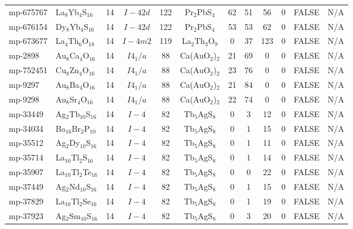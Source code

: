 {\begin{longtable}{llcccccccccc}
    mp-675767 & La$_{8}$Yb$_{4}$S$_{16}$ & 14    & $I-42d$ & 122   & Pr$_{2}$PbS$_{4}$ & 62    & 51    & 56    & 0     & FALSE & N/A \\
    mp-676154 & Dy$_{8}$Yb$_{4}$S$_{16}$ & 14    & $I-42d$ & 122   & Pr$_{2}$PbS$_{4}$ & 53    & 53    & 62    & 0     & FALSE & N/A \\
    mp-673677 & La$_{4}$Th$_{6}$O$_{18}$ & 14    & $I-4m2$ & 119   & La$_{2}$Th$_{3}$O$_{9}$ & 0     & 37    & 123   & 0     & FALSE & N/A \\
    mp-2898 & Au$_{8}$Ca$_{4}$O$_{16}$ & 14    & $I4_1/a$ & 88    & Ca(AuO$_{2}$)$_{2}$ & 21    & 69    & 0     & 0     & FALSE & N/A \\
    mp-752451 & Cu$_{8}$Zn$_{4}$O$_{16}$ & 14    & $I4_1/a$ & 88    & Ca(AuO$_{2}$)$_{2}$ & 23    & 76    & 0     & 0     & FALSE & N/A \\
    mp-9297 & Au$_{8}$Ba$_{4}$O$_{16}$ & 14    & $I4_1/a$ & 88    & Ca(AuO$_{2}$)$_{2}$ & 21    & 84    & 0     & 0     & FALSE & N/A \\
    mp-9298 & Au$_{8}$Sr$_{4}$O$_{16}$ & 14    & $I4_1/a$ & 88    & Ca(AuO$_{2}$)$_{2}$ & 22    & 74    & 0     & 0     & FALSE & N/A \\
    mp-33449 & Ag$_{2}$Tb$_{10}$S$_{16}$ & 14    & $I-4$ & 82    & Tb$_{5}$AgS$_{8}$ & 0     & 3     & 12    & 0     & FALSE & N/A \\
    mp-34034 & Ba$_{16}$Br$_{2}$P$_{10}$ & 14    & $I-4$ & 82    & Tb$_{5}$AgS$_{8}$ & 0     & 1     & 15    & 0     & FALSE & N/A \\
    mp-35512 & Ag$_{2}$Dy$_{10}$S$_{16}$ & 14    & $I-4$ & 82    & Tb$_{5}$AgS$_{8}$ & 0     & 1     & 11    & 0     & FALSE & N/A \\
    mp-35714 & La$_{10}$Tl$_{2}$S$_{16}$ & 14    & $I-4$ & 82    & Tb$_{5}$AgS$_{8}$ & 0     & 1     & 14    & 0     & FALSE & N/A \\
    mp-35907 & La$_{10}$Tl$_{2}$Te$_{16}$ & 14    & $I-4$ & 82    & Tb$_{5}$AgS$_{8}$ & 0     & 0     & 22    & 0     & FALSE & N/A \\
    mp-37449 & Ag$_{2}$Nd$_{10}$S$_{16}$ & 14    & $I-4$ & 82    & Tb$_{5}$AgS$_{8}$ & 0     & 1     & 15    & 0     & FALSE & N/A \\
    mp-37829 & La$_{10}$Tl$_{2}$Se$_{16}$ & 14    & $I-4$ & 82    & Tb$_{5}$AgS$_{8}$ & 0     & 1     & 19    & 0     & FALSE & N/A \\
    mp-37923 & Ag$_{2}$Sm$_{10}$S$_{16}$ & 14    & $I-4$ & 82    & Tb$_{5}$AgS$_{8}$ & 0     & 3     & 20    & 0     & FALSE & N/A \\

\end{longtable}}
